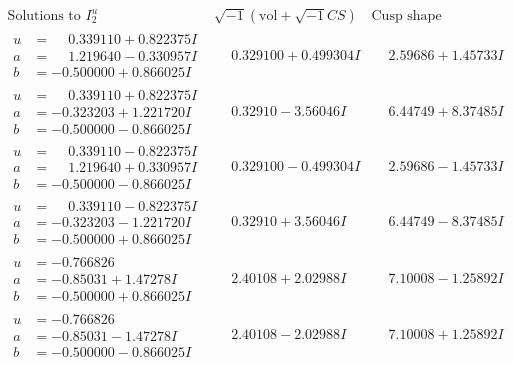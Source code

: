 \documentclass[1p]{elsarticle_modified}
\theoremstyle{definition}
\newcommand{\I}{\sqrt{-1}}
\begin{document}
$$\begin{array}{c|c|c}  
\text{Solutions to }I^u_{2}& \I (\text{vol} + \sqrt{-1}CS) & \text{Cusp shape}\\
 \hline 
\begin{aligned}
u &= \phantom{-}0.339110 + 0.822375 I \\
a &= \phantom{-}1.219640 - 0.330957 I \\
b &= -0.500000 + 0.866025 I\end{aligned}
 & \phantom{-}0.329100 + 0.499304 I & \phantom{-}2.59686 + 1.45733 I \\ \hline\begin{aligned}
u &= \phantom{-}0.339110 + 0.822375 I \\
a &= -0.323203 + 1.221720 I \\
b &= -0.500000 - 0.866025 I\end{aligned}
 & \phantom{-}0.32910 - 3.56046 I & \phantom{-}6.44749 + 8.37485 I \\ \hline\begin{aligned}
u &= \phantom{-}0.339110 - 0.822375 I \\
a &= \phantom{-}1.219640 + 0.330957 I \\
b &= -0.500000 - 0.866025 I\end{aligned}
 & \phantom{-}0.329100 - 0.499304 I & \phantom{-}2.59686 - 1.45733 I \\ \hline\begin{aligned}
u &= \phantom{-}0.339110 - 0.822375 I \\
a &= -0.323203 - 1.221720 I \\
b &= -0.500000 + 0.866025 I\end{aligned}
 & \phantom{-}0.32910 + 3.56046 I & \phantom{-}6.44749 - 8.37485 I \\ \hline\begin{aligned}
u &= -0.766826\phantom{ +0.000000I} \\
a &= -0.85031 + 1.47278 I \\
b &= -0.500000 + 0.866025 I\end{aligned}
 & \phantom{-}2.40108 + 2.02988 I & \phantom{-}7.10008 - 1.25892 I \\ \hline\begin{aligned}
u &= -0.766826\phantom{ +0.000000I} \\
a &= -0.85031 - 1.47278 I \\
b &= -0.500000 - 0.866025 I\end{aligned}
 & \phantom{-}2.40108 - 2.02988 I & \phantom{-}7.10008 + 1.25892 I \\ \hline\begin{aligned}

\end{aligned}
\end{array}$$
\end{document}
